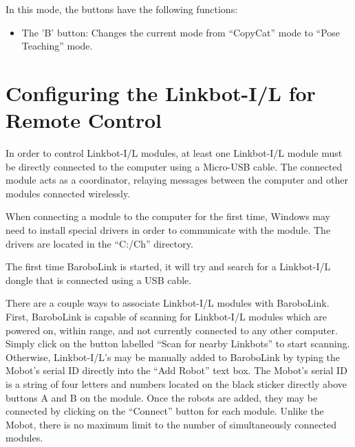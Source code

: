 \documentclass{article}
\begin{document}
In this mode, the buttons have the following functions:
\begin{itemize}
\item The 'B' button: Changes the current mode from ``CopyCat'' mode to ``Pose Teaching'' mode.
\end{itemize}

\section{Configuring the Linkbot-I/L for Remote Control}
In order to control Linkbot-I/L modules, at least one Linkbot-I/L module must be directly 
connected to the computer using a Micro-USB cable. The connected module acts as a 
coordinator, relaying messages between the computer and other modules connected wirelessly.

When connecting a module to the computer for the first time, Windows may need to install
special drivers in order to communicate with the module. The drivers are located in the
``C:/Ch'' directory.

The first time BaroboLink is started, it will try and search for a Linkbot-I/L dongle
that is connected using a USB cable. 

There are a couple ways to associate Linkbot-I/L modules with BaroboLink. First, BaroboLink
is capable of scanning for Linkbot-I/L modules which are powered on, within range, and
not currently connected to any other computer. Simply click on the button 
labelled ``Scan for nearby Linkbots'' to start scanning. Otherwise,
Linkbot-I/L's may be manually added to BaroboLink by typing the Mobot's serial ID
directly into the ``Add Robot'' text box. The Mobot's serial ID is a string of 
four letters and numbers located on the black sticker directly above buttons A and B
on the module. Once the robots are added, they may be connected by clicking on the 
``Connect'' button for each module. Unlike the Mobot, there is no maximum limit
to the number of simultaneously connected modules.
\end{document}

